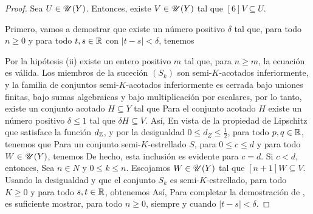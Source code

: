 \begin{proof}
	Sea $U\in\mathscr{U}(Y)$. Entonces, existe $V\in\mathscr{U}(Y)$ tal que $[6]V\subseteq U$.
	
	Primero, vamos a demostrar que existe un n\'umero positivo $\delta$			
	tal que, para todo $n\geq0$ y para todo  $t,s\in\mathbb{R}$ con $|t-s|<\delta$,
	tenemos
	
	Por la hip\'otesis (ii) existe un entero positivo $m$ tal que, para $n\geq m$, 
	la ecuaci\'on  es v\'alida. Los miembros de la suceci\'on  $(S_k)$
	son semi-$K$-acotados inferiormente, y la familia de conjuntos semi-$K$-acotados
	inferiormente es cerrada bajo uniones finitas, bajo sumas algebraicas y bajo
	multiplicaci\'on por escalares, por lo tanto, existe un conjunto acotado $H\subseteq Y$
	tal que 
	Para el conjunto acotado $H$ existe un n\'umero positivo $\delta\leq 1$
	tal que $\delta H\subseteq V$. As\'i,
	En vista de la propiedad de Lipschitz que satisface la funci\'on $d_{\mathbb{Z}}$, y por 
	la desigualdad $0\leq d_Z\leq \frac12$, para todo $p,q\in\mathbb{R}$, tenemos que 
	Para un conjunto semi-$K$-estrellado $S$, para $0\leq c\leq d$ y para todo 
	$W\in\mathscr{U}(Y)$, tenemos
	De hecho, esta inclusi\'on es evidente para $c=d$. Si $c<d$, entonces, 
	Sea $n\in N$ y $0\leq k\leq n$. Escojamos $W\in\mathscr{U}(Y)$ tal que $[n+1]W\subseteq V$.
	Usando la desigualdad  y que el conjunto $S_k$ es semi-$K$-estrellado, 
	para todo $K\geq0$ y para todo $s,t\in\mathbb{R}$, obtenemos
	As\'i, 
	Para completar la demostraci\'on de , es suficiente mostrar, para todo 
	$n\geq0$,
	siempre y cuando $|t-s|<\delta$. 
	

\end{proof}
